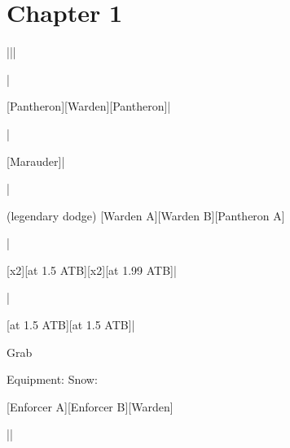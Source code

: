 \section{Chapter 1}

\begin{mainlist}
	\item {}
	\item {} |\skip||\skip
	\item \skip|\skip
	\item {} [Pantheron]\to{}[Warden]\to{}[Pantheron]|\skip
	\item \skip|\skip
	\item {} [Marauder]\to{}|
	\item \skip|\skip
	\item {} (legendary dodge) [Warden A]\to{}[Warden B]\to{}[Pantheron A]
	\item \skip|\skip
	\item {} \to{}[x2]\to{}[at 1.5 ATB]\to{}[x2]\to{}[at 1.99 ATB]\to{}|\skip
	\item \save|\skip
	\item {} [at 1.5 ATB]\to{}\to{}\to{}[at 1.5 ATB]\to{}\to{}\to{}|
	\item Grab 
\end{mainlist}

\begin{menu}
	\item Equipment: Snow: 
\end{menu}

\begin{mainlist}
	\item \skip
	\item {} [Enforcer A]\to{}[Enforcer B]\to{}[Warden]
	\item {}|\skip|\save
\end{mainlist}
